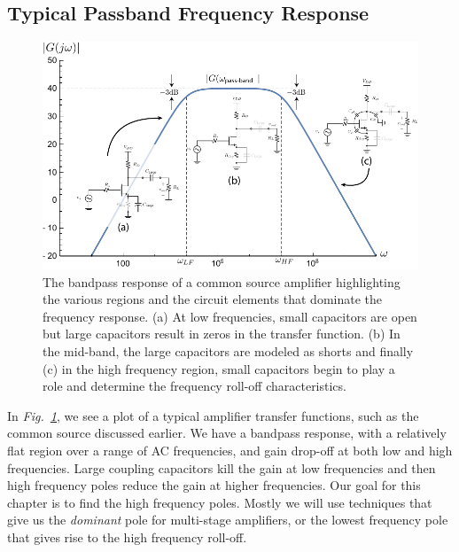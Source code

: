 \subsection{Typical Passband Frequency Response}
\begin{figure}[tb]
\centering
\includegraphics[width=.95\columnwidth]{amp_bandpass_decorate} 
\caption{The bandpass response of a common source amplifier highlighting the various regions and the circuit elements that dominate the frequency response.  (a) At low frequencies, small capacitors are open but large capacitors result in zeros in the transfer function.  (b) In the mid-band, the large capacitors are modeled as shorts and finally (c) in the high frequency region, small capacitors begin to play a role and determine the frequency roll-off characteristics.}
\label{fig:amp_bandpass}
\end{figure}
In \emph{Fig.~\ref{fig:amp_bandpass}}, we see a plot of a typical amplifier transfer functions, such as the common source discussed earlier.  We have a bandpass response, with a relatively flat region over a range of AC frequencies, and gain drop-off at both low and high frequencies.  Large coupling capacitors kill the gain at low frequencies and then high frequency poles reduce the gain at higher frequencies. Our goal for this chapter is to find the high frequency poles.  Mostly we will use techniques that give us the \emph{dominant} pole for multi-stage amplifiers, or the lowest frequency pole that gives rise to the high frequency roll-off.
